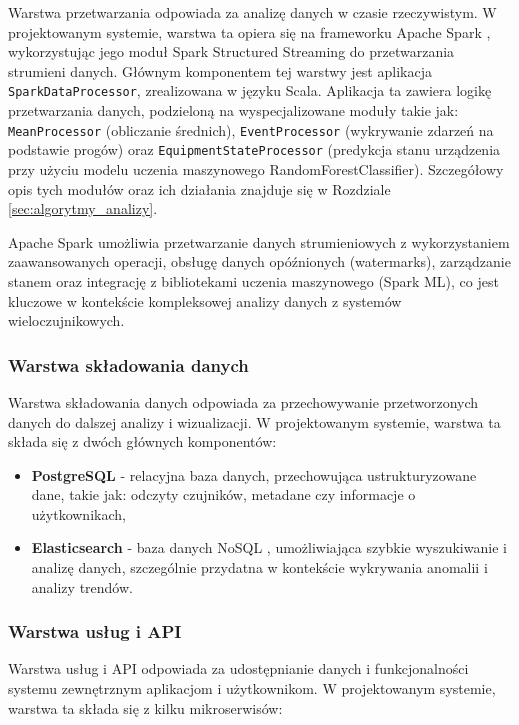 Warstwa przetwarzania odpowiada za analizę danych w czasie rzeczywistym. W projektowanym systemie, warstwa ta opiera się na frameworku Apache Spark \cite{spark_streaming}, wykorzystując jego moduł Spark Structured Streaming do przetwarzania strumieni danych. Głównym komponentem tej warstwy jest aplikacja \texttt{SparkDataProcessor}, zrealizowana w języku Scala. Aplikacja ta zawiera logikę przetwarzania danych, podzieloną na wyspecjalizowane moduły takie jak: \texttt{MeanProcessor} (obliczanie średnich), \texttt{EventProcessor} (wykrywanie zdarzeń na podstawie progów) oraz \texttt{EquipmentStateProcessor} (predykcja stanu urządzenia przy użyciu modelu uczenia maszynowego RandomForestClassifier). Szczegółowy opis tych modułów oraz ich działania znajduje się w Rozdziale \ref{sec:algorytmy_analizy}.

Apache Spark umożliwia przetwarzanie danych strumieniowych z wykorzystaniem zaawansowanych operacji, obsługę danych opóźnionych (watermarks), zarządzanie stanem oraz integrację z bibliotekami uczenia maszynowego (Spark ML), co jest kluczowe w kontekście kompleksowej analizy danych z systemów wieloczujnikowych.

\subsubsection{Warstwa składowania danych}
\label{subsubsec:warstwa_skladowania}

Warstwa składowania danych odpowiada za przechowywanie przetworzonych danych do dalszej analizy i wizualizacji. W projektowanym systemie, warstwa ta składa się z dwóch głównych komponentów:

\begin{itemize}
    \item \textbf{PostgreSQL} - relacyjna baza danych, przechowująca ustrukturyzowane dane, takie jak: odczyty czujników, metadane czy informacje o użytkownikach,
    \item \textbf{Elasticsearch} - baza danych NoSQL \cite{nosql_definition}, umożliwiająca szybkie wyszukiwanie i analizę danych, szczególnie przydatna w kontekście wykrywania anomalii i analizy trendów.
\end{itemize}

\subsubsection{Warstwa usług i API}
\label{subsubsec:warstwa_uslug}

Warstwa usług i API odpowiada za udostępnianie danych i funkcjonalności systemu zewnętrznym aplikacjom i użytkownikom. W projektowanym systemie,
warstwa ta składa się z kilku mikroserwisów:

